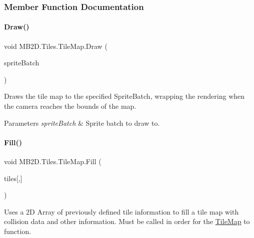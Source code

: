 \subsubsection{Member Function Documentation}
\hypertarget{class_m_b2_d_1_1_tiles_1_1_tile_map_aa4c7f815bf7b9fc53a4dcf1a2b0df175}{}\label{class_m_b2_d_1_1_tiles_1_1_tile_map_aa4c7f815bf7b9fc53a4dcf1a2b0df175} 
\paragraph{\texorpdfstring{Draw()}{Draw()}}
{\footnotesize\ttfamily void M\+B2\+D.\+Tiles.\+Tile\+Map.\+Draw (\begin{DoxyParamCaption}\item[{Sprite\+Batch}]{sprite\+Batch }\end{DoxyParamCaption})\hspace{0.3cm}{\ttfamily [inline]}}



Draws the tile map to the specified Sprite\+Batch, wrapping the rendering when the camera reaches the bounds of the map. 


\begin{DoxyParams}{Parameters}
{\em sprite\+Batch} & Sprite batch to draw to.\\
\hline
\end{DoxyParams}
\hypertarget{class_m_b2_d_1_1_tiles_1_1_tile_map_acc786702f8dfb76227fcd76ce0b20510}{}\label{class_m_b2_d_1_1_tiles_1_1_tile_map_acc786702f8dfb76227fcd76ce0b20510} 
\paragraph{\texorpdfstring{Fill()}{Fill()}}
{\footnotesize\ttfamily void M\+B2\+D.\+Tiles.\+Tile\+Map.\+Fill (\begin{DoxyParamCaption}\item[{\hyperlink{class_m_b2_d_1_1_tile}{Tile}}]{tiles\mbox{[},\mbox{]} }\end{DoxyParamCaption})\hspace{0.3cm}{\ttfamily [inline]}}



Uses a 2D Array of previously defined tile information to fill a tile map with collision data and other information. Must be called in order for the \hyperlink{class_m_b2_d_1_1_tiles_1_1_tile_map}{Tile\+Map} to function. 


